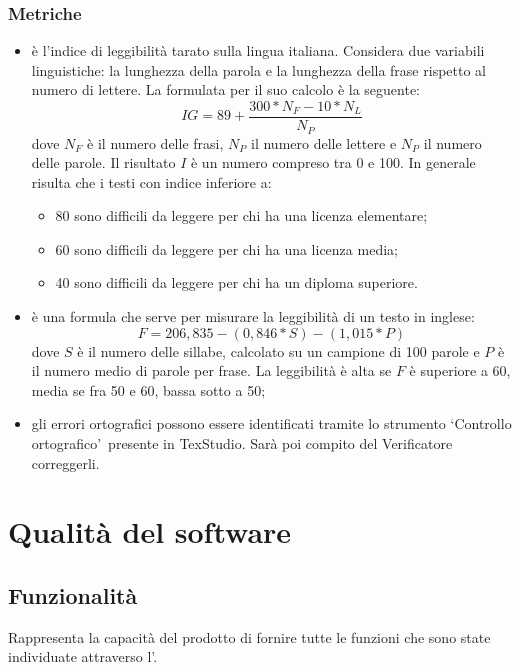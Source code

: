 \documentclass[PianoDiQualifica.tex]{subfiles}
\begin{document}
\subsubsection{Metriche}
\begin{itemize}
	\item {} è l'indice di leggibilità tarato sulla lingua italiana. Considera due variabili linguistiche: la lunghezza della parola e la lunghezza della frase rispetto al numero di lettere. La formulata per il suo calcolo è la seguente:
	\[IG=89+\dfrac{300*N_F-10*N_L}{N_P}\] dove $ N_F $ è il numero delle frasi, $ N_P $ il numero delle lettere e $ N_P $ il numero delle parole. Il risultato $I$ è un numero compreso tra 0 e 100. In generale risulta che i testi con indice inferiore a:
	\begin{itemize}
		\item 80 sono difficili da leggere per chi ha una licenza elementare;
		\item 60 sono difficili da leggere per chi ha una licenza media;
		\item 40 sono difficili da leggere per chi ha un diploma superiore.
	\end{itemize}	
	\item {} è una formula che serve per misurare la leggibilità di un testo in inglese:
	\[F=206,835-(0,846*S)-(1,015*P)\] dove $ S $ è il numero delle sillabe, calcolato su un campione di 100 parole e $ P $ è il numero medio di parole per frase.
	La leggibilità è alta se $F$ è superiore a 60, media se fra 50 e 60, bassa sotto a 50;
	\item {} gli errori ortografici possono essere identificati tramite lo strumento \textquoteleft Controllo ortografico\textquoteright\ presente in TexStudio. Sarà poi compito del Verificatore correggerli.  	
\end{itemize}
		
\section{Qualità del software}
\subsection{Funzionalità}
Rappresenta la capacità del prodotto di fornire tutte le funzioni che sono state individuate attraverso l'\adr.	
\end{document}
